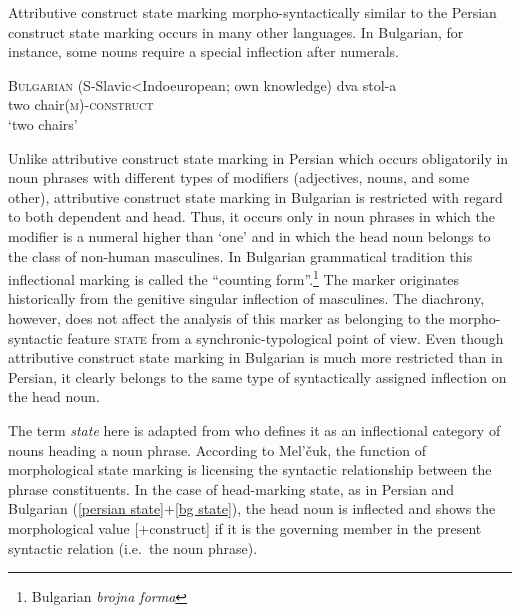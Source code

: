 Attributive construct state marking morpho-syntactically similar to the Persian construct state marking occurs in many other languages. In Bulgarian, for instance, some nouns require a special inflection after numerals.
\newpage
\begin{exe}
\ex \textsc{Bulgarian} (S-Sla\-vic<Indoeuropean; own knowledge)
\label{bg state}
\gll 	dva 	stol-a\\
	two	chair{\textsc{(m)-construct}}\\
\glt 	‘two chairs’
\end{exe}
Unlike attributive construct state marking in Persian which occurs obligatorily in noun phrases with different types of modifiers (adjectives, nouns, and some other), attributive construct state marking in Bulgarian is restricted with regard to both dependent and head. Thus, it occurs only in noun phrases in which the modifier is a numeral higher than ‘one’ and in which the head noun belongs to the class of non-human masculines. In Bulgarian grammatical tradition this inflectional marking is called the “counting form”.\footnote{Bulgarian \emph{brojna forma}} The marker originates historically from the genitive singular inflection of masculines. The diachrony, however, does not affect the analysis of this marker as belonging to the morpho-syntactic feature \textsc{state} from a synchronic-typological point of view. Even though attributive construct state marking in Bulgarian is much more restricted than in Persian, it clearly belongs to the same type of syntactically assigned inflection on the head noun.

The term \emph{state} here is adapted from \citet[114–116]{melcuk2006} who defines it as an inflectional category of nouns heading a noun phrase. According to Mel'čuk, the function of morphological state marking is licensing the syntactic relationship between the phrase constituents. In the case of head-marking state, as in Persian and Bulgarian (\ref{persian state}+\ref{bg state}), the head noun is inflected and shows the morphological value [+construct] if it is the governing member in the present syntactic relation (i.e.~the noun phrase). 


